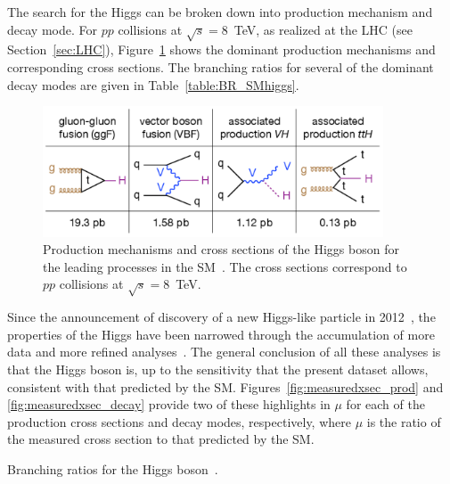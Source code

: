 The search for the Higgs can be broken down into production mechanism and decay mode. For $pp$
collisions at $\sqrt{s} = 8$~TeV, as realized at the LHC (see Section~\ref{sec:LHC}),
Figure~\ref{fig:higgsprod} shows the
dominant production mechanisms and corresponding cross sections. The branching ratios for several
of the dominant decay modes are given in Table~\ref{table:BR_SMhiggs}.

\begin{figure}[ht]
 \begin{center}
    \includegraphics[width=0.90\textwidth]{figures/intro/higgsproductions.pdf}
      \end{center}
\caption{Production mechanisms and cross sections of the Higgs boson
for the leading processes in the SM~\cite{Tuna:thesis}. The cross sections correspond to
$pp$ collisions at $\sqrt{s} = 8$~TeV.}
\label{fig:higgsprod}
\end{figure}

Since the announcement of discovery of a new Higgs-like particle
in 2012~\cite{higgsdiscoveryAtlas,Chatrchyan:2012ufa}, the properties of the Higgs have been narrowed
through the accumulation of more data and more refined analyses~\cite{Hdiscovery}. The general
conclusion of all these analyses is that the Higgs boson is, up to the sensitivity that the present
dataset allows, consistent with that predicted by the SM. Figures~\ref{fig:measuredxsec_prod} and
\ref{fig:measuredxsec_decay} provide two of these highlights in $\mu$ for each of the
production cross sections and decay modes, respectively, where $\mu$ is the
ratio of the measured cross section to that predicted by the SM.

\begin{table}[ht]
  \centering
  \renewcommand{\arraystretch}{1.4}
  \caption{Branching ratios for the Higgs boson~\cite{LHC:SMHiggsBR}.}
  
  \label{table:BR_SMhiggs}
\end{table}

